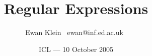 % 
%
%
%
%
%
%
%
%
%
%
%

% 

\title{Regular Expressions}
\author{Ewan Klein \newline \mbox{ }ewan@inf.ed.ac.uk\mbox{ }}
\date{ICL --- 10 October 2005}



%
\usepackage{fancybox}
\usepackage{color}
\usepackage{amsmath}
\usepackage{graphicx}
\usepackage{alltt}
\usepackage{url}


\newcommand{\Hilite}[1]{\colorbox{yellow}{#1}}
\newcommand{\Shade}[1]{\colorbox{light}{#1}}


\newcommand{\Comment}[1]{\textcolor{blue}{#1}}
\newcommand{\Em}[1]{\textcolor{red}{#1}}
\newcommand{\Dim}[1]{\textcolor{gray}{#1}}

\setlength{\parskip}{0in}
\setlength{\parindent}{0in}




\frame{\titlepage}




